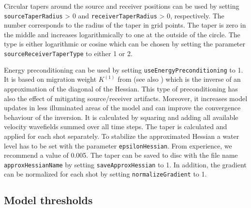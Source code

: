 \documentclass[pdftex,a4paper,parskip,listof=totoc,bibliography=totoc,onehalfspacing,12pt]{scrreprt}
\begin{document}
Circular tapers around the source and receiver positions can be used by setting \verb+sourceTaperRadius+ > 0 and \verb+receiverTaperRadius+ > 0, respectively. The number corresponds to the radius of the taper in grid points. The taper is zero in the middle and increases logarithmically to one at the outside of the circle. The type is either logarithmic or cosine which can be chosen by setting the parameter \verb+sourceReceiverTaperType+ to either 1 or 2.

Energy preconditioning can be used by setting \verb+useEnergyPreconditioning+ to 1. It is based on migration weight $K^{(1)}$ from \cite{plessix:04} (see also \cite{shin:01}) which is the inverse of an approximation of the diagonal of the Hessian. This type of preconditioning has also the effect of mitigating source/receiver artifacts. Moreover, it increases model updates in less illuminated areas of the model and can improve the convergence behaviour of the inversion. It is calculated by squaring and adding all available velocity wavefields summed over all time steps. The taper is calculated and applied for each shot separately. To stabilize the approximated Hessian a water level has to be set with the parameter \verb+epsilonHessian+. From experience, we recommend a value of 0.005.
The taper can be saved to disc with the file name \verb+approxHessianName+ by setting \verb+saveApproxHessian+ to 1.
In addition, the gradient can be normalized for each shot by setting \verb+normalizeGradient+ to 1.
\subsection{Model thresholds}
\end{document}
